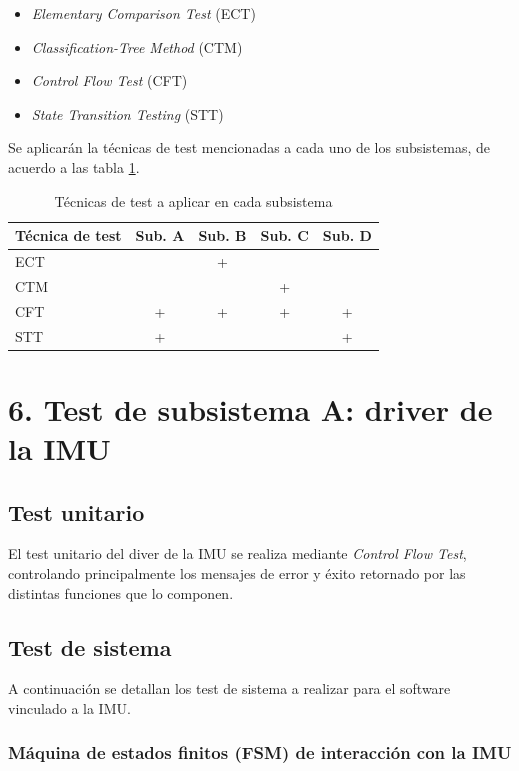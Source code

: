 \documentclass[
11pt, %
codirector, %
]{simple_charter}
\begin{document}
\begin{itemize}
	\item \textit{Elementary Comparison Test} (ECT)
	\item \textit{Classification-Tree Method} (CTM)
	\item \textit{Control Flow Test} (CFT)
	\item \textit{State Transition Testing} (STT)
\end{itemize}

Se aplicarán la técnicas de test mencionadas a cada uno de los subsistemas, de acuerdo a las tabla
\ref{tab:tec-subsys}.

\begin{table}[H]
\centering
\begin{tabular}{@{}lcccc@{}}
\toprule
Técnica de test & Sub. A & Sub. B & Sub. C & Sub. D \\ \midrule
ECT &   & + &  &  \\
CTM &  &  & + &  \\
CFT & + & + & + & + \\
STT & + &  &  & + \\ \bottomrule
\end{tabular}
\caption{Técnicas de test a aplicar en cada subsistema}
\label{tab:tec-subsys}
\end{table}

\pagebreak
\section{6. Test de subsistema A: driver de la IMU}
\label{sec:6-test-de-subsistema-a-driver-de-la-imu}

\subsection{Test unitario}
\label{ssec:test-unitario}

El test unitario del diver de la IMU se realiza mediante \textit{Control Flow Test},
controlando principalmente los mensajes de error y éxito retornado por las distintas funciones
que lo componen.

\subsection{Test de sistema}
\label{ssec:test-de-sistema}

A continuación se detallan los test de sistema a realizar para el software vinculado a la IMU.

\subsubsection{Máquina de estados finitos (FSM) de interacción con la IMU}
\label{sssec:maquina-de-estados-finitos-fsm-de-interaccion-con-la-imu}
\end{document}
